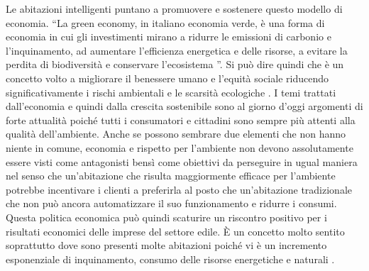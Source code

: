 Le abitazioni intelligenti puntano a promuovere e sostenere questo modello di economia.  “La green economy, in italiano economia verde, è una forma di economia in cui gli investimenti mirano a ridurre le emissioni di carbonio e l’inquinamento, ad aumentare l’efficienza energetica e delle risorse, a evitare la perdita di biodiversità e conservare l’ecosistema ”. Si può dire quindi che è un concetto volto a migliorare il benessere umano e l’equità sociale riducendo significativamente i rischi ambientali e le scarsità ecologiche .
I temi trattati dall’economia e quindi dalla crescita sostenibile sono al giorno d’oggi argomenti di forte attualità poiché tutti i consumatori e cittadini sono sempre più attenti alla qualità dell’ambiente. Anche se possono sembrare due elementi che non hanno niente in comune, economia e rispetto per l’ambiente non devono assolutamente essere visti come antagonisti bensì come obiettivi da perseguire in ugual maniera nel senso che un’abitazione che risulta maggiormente efficace per l’ambiente potrebbe incentivare i clienti a preferirla al posto che un’abitazione tradizionale che non può ancora automatizzare il suo funzionamento e ridurre i consumi. Questa politica economica può quindi scaturire un riscontro positivo per i risultati economici delle imprese del settore edile. È un concetto molto sentito soprattutto dove sono presenti molte abitazioni poiché vi è un incremento esponenziale di inquinamento, consumo delle risorse energetiche e naturali .
